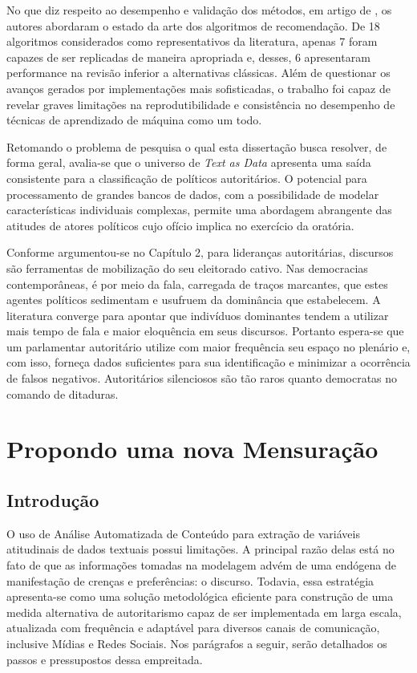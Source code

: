\documentclass[
12pt,				%
openright,			%
twoside,			%
a4paper,			%
english,			%
french,				%
spanish,			%
brazil				%
]{abntex2}
\begin{document}
No que diz respeito ao desempenho e validação dos métodos, em artigo de , os autores abordaram o estado da arte dos algoritmos de recomendação. De 18 algoritmos considerados como representativos da literatura, apenas 7 foram capazes de ser replicadas de maneira apropriada e, desses, 6 apresentaram performance na revisão inferior a alternativas clássicas. Além de questionar os avanços gerados por implementações mais sofisticadas, o trabalho foi capaz de revelar graves limitações na reprodutibilidade e consistência no desempenho de técnicas de aprendizado de máquina como um todo.  

Retomando o problema de pesquisa o qual esta dissertação busca resolver, de forma geral, avalia-se que o universo de \emph{Text as Data} apresenta uma saída consistente para a classificação de políticos autoritários. O potencial para processamento de grandes bancos de dados, com a possibilidade de modelar características individuais complexas, permite uma abordagem abrangente das atitudes de atores políticos cujo ofício implica no exercício da oratória.

Conforme argumentou-se no Capítulo 2, para lideranças autoritárias, discursos são ferramentas de mobilização do seu eleitorado cativo. Nas democracias contemporâneas, é por meio da fala, carregada de traços marcantes, que estes agentes políticos sedimentam e usufruem da dominância que estabelecem. A literatura converge para apontar que indivíduos dominantes tendem a utilizar mais tempo de fala e maior eloquência em seus discursos. Portanto espera-se que um parlamentar autoritário utilize com maior frequência seu espaço no plenário e, com isso, forneça dados suficientes para sua identificação e minimizar a ocorrência de falsos negativos. Autoritários silenciosos são tão raros quanto democratas no comando de ditaduras. 

\chapter{Propondo uma nova Mensuração}

\section{Introdução}

O uso de Análise Automatizada de Conteúdo para extração de variáveis atitudinais de dados textuais possui limitações. A principal razão delas está no fato de que as informações tomadas na modelagem advém de uma endógena de manifestação de crenças e preferências: o discurso. Todavia, essa estratégia apresenta-se como uma solução metodológica eficiente para construção de uma medida alternativa de autoritarismo capaz de ser implementada em larga escala, atualizada com frequência e adaptável para diversos canais de comunicação, inclusive Mídias e Redes Sociais. Nos parágrafos a seguir, serão detalhados os passos e pressupostos dessa empreitada.
\end{document}
